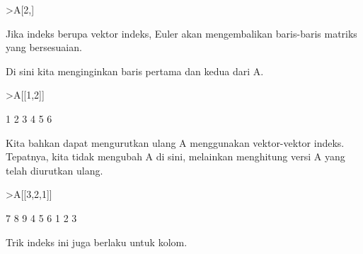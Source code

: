 \documentclass{article}
\newenvironment{eulernotebook}{\par}{\par}
\newenvironment{eulercomment}{\par\medskip}{\par\medskip}
\begin{document}
\begin{eulernotebook}
\begin{eulercomment}
\begin{eulercomment}
\begin{eulercomment}
\begin{eulercomment}
\begin{eulercomment}
\begin{eulercomment}
\begin{eulerprompt}
>A[2,]
\end{eulerprompt}
\begin{euleroutput}
  [4,  5,  6]
\end{euleroutput}
\begin{eulercomment}
Jika indeks berupa vektor indeks, Euler akan mengembalikan baris-baris
matriks yang bersesuaian.

Di sini kita menginginkan baris pertama dan kedua dari A.
\end{eulercomment}
\begin{eulerprompt}
>A[[1,2]]
\end{eulerprompt}
\begin{euleroutput}
              1             2             3 
              4             5             6 
\end{euleroutput}
\begin{eulercomment}
Kita bahkan dapat mengurutkan ulang A menggunakan vektor-vektor
indeks. Tepatnya, kita tidak mengubah A di sini, melainkan menghitung
versi A yang telah diurutkan ulang.
\end{eulercomment}
\begin{eulerprompt}
>A[[3,2,1]]
\end{eulerprompt}
\begin{euleroutput}
              7             8             9 
              4             5             6 
              1             2             3 
\end{euleroutput}
\begin{eulercomment}
Trik indeks ini juga berlaku untuk kolom.


\end{eulercomment}
\end{eulercomment}
\end{eulercomment}
\end{eulercomment}
\end{eulercomment}
\end{eulercomment}
\end{eulercomment}
\end{eulernotebook}
\end{document}
